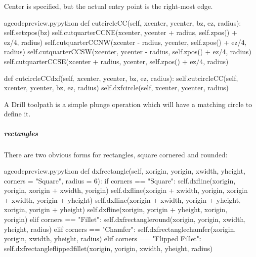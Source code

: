 \documentclass{ltxdoc}
\begin{document}
Center is specified, but the actual entry point is the right-most edge.

\lstset{firstnumber=\thegcpy}
\begin{writecode}{a}{gcodepreview.py}{python}
    def cutcircleCC(self, xcenter, ycenter, bz, ez, radius):
        self.setzpos(bz)
        self.cutquarterCCNE(xcenter, ycenter + radius, self.zpos() + ez/4, radius) 
        self.cutquarterCCNW(xcenter - radius, ycenter, self.zpos() + ez/4, radius) 
        self.cutquarterCCSW(xcenter, ycenter - radius, self.zpos() + ez/4, radius) 
        self.cutquarterCCSE(xcenter + radius, ycenter, self.zpos() + ez/4, radius) 

    def cutcircleCCdxf(self, xcenter, ycenter, bz, ez, radius):
        self.cutcircleCC(self, xcenter, ycenter, bz, ez, radius)
        self.dxfcircle(self, xcenter, ycenter, radius)

\end{writecode}
\addtocounter{gcpy}{11}

A Drill toolpath is a simple plunge operation which will have a matching circle to define it.

\subparagraph{rectangles}

There are two obvious forms for rectangles, square cornered and rounded:

\lstset{firstnumber=\thegcpy}
\begin{writecode}{a}{gcodepreview.py}{python}
    def dxfrectangle(self, xorigin, yorigin, xwidth, yheight, corners = "Square", radius = 6):
        if corners == "Square":
            self.dxfline(xorigin, yorigin, xorigin + xwidth, yorigin)
            self.dxfline(xorigin + xwidth, yorigin, xorigin + xwidth, yorigin + yheight)
            self.dxfline(xorigin + xwidth, yorigin + yheight, xorigin, yorigin + yheight)
            self.dxfline(xorigin, yorigin + yheight, xorigin, yorigin)
        elif corners == "Fillet":
            self.dxfrectangleround(xorigin, yorigin, xwidth, yheight, radius)
        elif corners == "Chamfer":
            self.dxfrectanglechamfer(xorigin, yorigin, xwidth, yheight, radius)
        elif corners == "Flipped Fillet":
            self.dxfrectangleflippedfillet(xorigin, yorigin, xwidth, yheight, radius)

\end{writecode}
\addtocounter{gcpy}{13}

\end{document}
